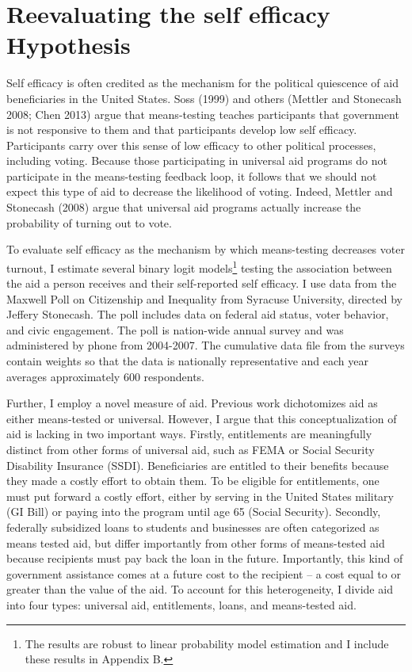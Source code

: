 \documentclass[12pt]{paper}
\begin{document}
\section{Reevaluating the self efficacy Hypothesis}
Self efficacy is often credited as the mechanism for the political quiescence of aid beneficiaries in the United States. Soss (1999) and others (Mettler and Stonecash 2008; Chen 2013) argue that means-testing teaches participants that government is not responsive to them and that participants develop low self efficacy. Participants carry over this sense of low efficacy to other political processes, including voting. Because those participating in universal aid programs do not participate in the means-testing feedback loop, it follows that we should not expect this type of aid to decrease the likelihood of voting. Indeed, Mettler and Stonecash (2008) argue that universal aid programs actually increase the probability of turning out to vote.  

To evaluate self efficacy as the mechanism by which means-testing decreases voter turnout, I estimate several binary logit models\footnote{The results are robust to linear probability model estimation and I include these results in Appendix B.} testing the association between the aid a person receives and their self-reported self efficacy. I use data from the Maxwell Poll on Citizenship and Inequality from Syracuse University, directed by Jeffery Stonecash. The poll includes data on federal aid status, voter behavior, and civic engagement. The poll is nation-wide annual survey and was administered by phone from 2004-2007. The cumulative data file from the surveys contain weights so that the data is nationally representative and each year averages approximately 600 respondents.

Further, I employ a novel measure of aid. Previous work dichotomizes aid as either means-tested or universal. However, I argue that this conceptualization of aid is lacking in two important ways. Firstly, entitlements are meaningfully distinct from other forms of universal aid, such as FEMA or Social Security Disability Insurance (SSDI). Beneficiaries are entitled to their benefits because they made a costly effort to obtain them. To be eligible for entitlements, one must put forward a costly effort, either by serving in the United States military (GI Bill) or paying into the program until age 65 (Social Security). Secondly, federally subsidized loans to students and businesses are often categorized as means tested aid, but differ importantly from other forms of means-tested aid because recipients must pay back the loan in the future. Importantly, this kind of government assistance comes at a future cost to the recipient – a cost equal to or greater than the value of the aid. To account for this heterogeneity, I divide aid into four types: universal aid, entitlements, loans, and means-tested aid.
\end{document}
